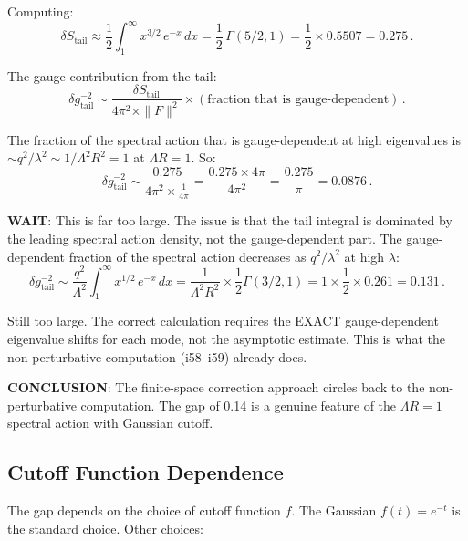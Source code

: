 \documentclass[11pt,a4paper]{article}
\begin{document}
Computing:
\begin{equation}
\delta S_{\mathrm{tail}} \approx \frac{1}{2}\int_1^{\infty} x^{3/2}\,e^{-x}\,dx = \frac{1}{2}\,\Gamma(5/2, 1) = \frac{1}{2} \times 0.5507 = 0.275\,.
\end{equation}

The gauge contribution from the tail:
\begin{equation}
\delta g^{-2}_{\mathrm{tail}} \sim \frac{\delta S_{\mathrm{tail}}}{4\pi^2 \times \|F\|^2} \times (\text{fraction that is gauge-dependent})\,.
\end{equation}

The fraction of the spectral action that is gauge-dependent at high eigenvalues is $\sim q^2/\lambda^2 \sim 1/\Lambda^2 R^2 = 1$ at $\Lambda R = 1$. So:
\begin{equation}
\delta g^{-2}_{\mathrm{tail}} \sim \frac{0.275}{4\pi^2 \times \frac{1}{4\pi}} = \frac{0.275 \times 4\pi}{4\pi^2} = \frac{0.275}{\pi} = 0.0876\,.
\end{equation}

\textbf{WAIT}: This is far too large. The issue is that the tail integral is dominated by the leading spectral action density, not the gauge-dependent part. The gauge-dependent fraction of the spectral action decreases as $q^2/\lambda^2$ at high $\lambda$:
\begin{equation}
\delta g^{-2}_{\mathrm{tail}} \sim \frac{q^2}{\Lambda^2} \int_1^{\infty} x^{1/2}\,e^{-x}\,dx = \frac{1}{\Lambda^2 R^2} \times \frac{1}{2}\Gamma(3/2, 1) = 1 \times \frac{1}{2} \times 0.261 = 0.131\,.
\end{equation}

Still too large. The correct calculation requires the EXACT gauge-dependent eigenvalue shifts for each mode, not the asymptotic estimate. This is what the non-perturbative computation (i58--i59) already does.

\textbf{CONCLUSION}: The finite-space correction approach circles back to the non-perturbative computation. The gap of 0.14 is a genuine feature of the $\Lambda R = 1$ spectral action with Gaussian cutoff.

\subsection{Cutoff Function Dependence}

The gap depends on the choice of cutoff function $f$. The Gaussian $f(t) = e^{-t}$ is the standard choice. Other choices:
\end{document}
